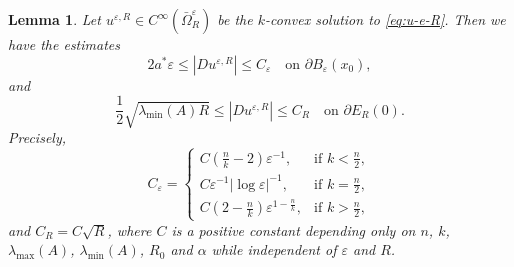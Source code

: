 \documentclass[reqno]{amsart}
\newtheorem{lemma}[theorem]{Lemma}
\theoremstyle{remark}
\theoremstyle{definition}
\numberwithin{equation}{section}
\begin{document}
\begin{lemma}\label{lem:gra-bdy}
	Let $u^{\varepsilon,R}\in C^\infty(\bar{\Omega}_R^\varepsilon)$ be the $k$-convex solution to \eqref{eq:u-e-R}. Then 
	we have the estimates
	$$2a^*\varepsilon\leq|Du^{\varepsilon,R}|\leq C_\varepsilon\quad\text{on }\partial B_\varepsilon(x_0),$$
	and 
	$$
	\frac{1}{2}\sqrt{\lambda_{\mathrm{min}}(A)R}\leq|Du^{\varepsilon,R}|\leq C_R\quad\text{on }\partial E_R(0).$$
	Precisely, 
	\begin{equation*}
		C_\varepsilon = 
		\begin{cases}
			C\left( \frac{n}{k} - 2 \right) \varepsilon^{-1}, & \text{if } k < \frac{n}{2}, \\[10pt]
			C\varepsilon^{-1} |\log \varepsilon|^{-1}, & \text{if } k = \frac{n}{2}, \\[10pt]
			C\left( 2 - \frac{n}{k} \right) \varepsilon^{1-\frac{n}{k}}, & \text{if } k > \frac{n}{2},
		\end{cases}
	\end{equation*}
	and $C_R=C\sqrt{R}$, where $C$ is a  positive constant depending only on $n$, $k$, $\lambda_{\mathrm{max}}(A)$, $\lambda_{\mathrm{min}}(A)$, $R_0$ and $\alpha$ while independent of $\varepsilon$ and $R$. 
\end{lemma}
\end{document}
